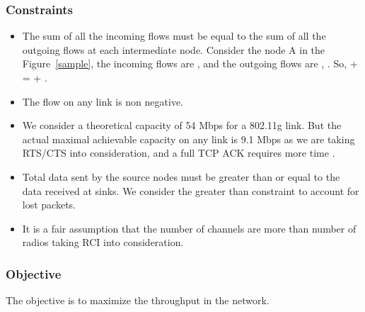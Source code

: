 \documentclass[conference]{IEEEtran}
\begin{document}
\subsubsection{Constraints}
\begin{itemize}
 \item 
 
The sum of all the incoming flows must be equal to the sum of all the outgoing flows at each intermediate node.
Consider the node A in the Figure~\ref{sample}, the incoming flows are ,  and the outgoing flows are , .
So,   +  =  + .

\item 

The flow on any link is non negative.
\begin{center}
   
 
\end{center}

\item   

We consider a theoretical capacity of 54 Mbps for a 802.11g link. But the actual maximal achievable capacity on any link is 9.1 Mbps \cite{throughputmax} 
as we are taking RTS/CTS into consideration, and a full TCP ACK requires more time . 
\begin{center}
     
\end{center}


\item  

Total data sent by the source nodes must be greater than or equal to the data received at sinks. We consider the greater than constraint to account for lost packets.
\begin{center}

    
 
\end{center}
\item   

It is a fair assumption that the number of channels are more than number of radios taking RCI into consideration.
\begin{center}
     
\end{center}

\end{itemize}

\subsubsection{Objective}
The objective is to maximize the throughput in the network.
\end{document}
